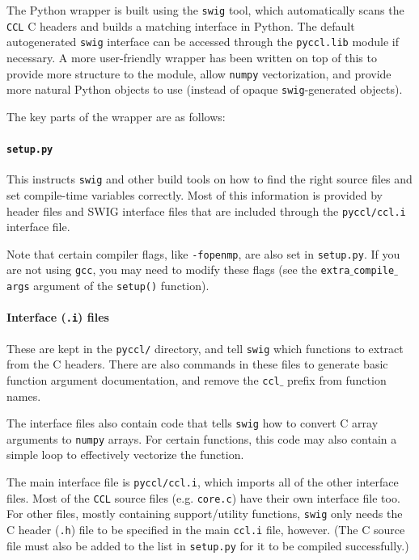 \documentclass[\docopts]{\docclass}
\newcommand{\ccl}{{\tt CCL}\xspace}
\begin{document}
The Python wrapper is built using the {\tt swig} tool, which automatically scans the \ccl C headers and builds a matching interface in Python. The default autogenerated {\tt swig} interface can be accessed through the {\tt pyccl.lib} module if necessary. A more user-friendly wrapper has been written on top of this to provide more structure to the module, allow {\tt numpy} vectorization, and provide more natural Python objects to use (instead of opaque {\tt swig}-generated objects).

The key parts of the wrapper are as follows:
\paragraph{{\tt setup.py}} This instructs {\tt swig} and other build tools on how to find the right source files and set compile-time variables correctly. Most of this information is provided by header files and SWIG interface files that are included through the {\tt pyccl/ccl.i} interface file.

Note that certain compiler flags, like {\tt -fopenmp}, are also set in {\tt setup.py}. If you are not using {\tt gcc}, you may need to modify these flags (see the {\tt extra$\_$compile$\_$args} argument of the {\tt setup()} function).

\paragraph{Interface ({\tt .i}) files} These are kept in the {\tt pyccl/} directory, and tell {\tt swig} which functions to extract from the C headers. There are also commands in these files to generate basic function argument documentation, and remove the {\tt ccl$\_$} prefix from function names.

The interface files also contain code that tells {\tt swig} how to convert C array arguments to {\tt numpy} arrays. For certain functions, this code may also contain a simple loop to effectively vectorize the function.

The main interface file is {\tt pyccl/ccl.i}, which imports all of the other interface files. Most of the \ccl source files (e.g. {\tt core.c}) have their own interface file too. For other files, mostly containing support/utility functions, {\tt swig} only needs the C header ({\tt .h}) file to be specified in the main {\tt ccl.i} file, however. (The C source file must also be added to the list in {\tt setup.py} for it to be compiled successfully.)
\end{document}
